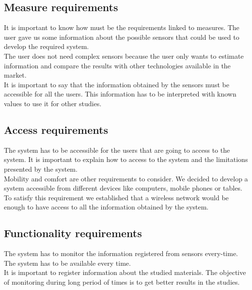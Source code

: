 \subsection{Measure requirements}

It is important to know how must be the requirements linked to measures. The user gave us some information about the possible sensors that could be used to develop the required system.\\

The user does not need complex sensors because the user only wants to estimate information and compare the results with other technologies available in the market.\\

It is important to say that the information obtained by the sensors must be accessible for all the users. This information has to be interpreted with known values to use it for other studies.

\subsection{Access requirements}

The system has to be accessible for the users that are going to access to the system. It is important to explain how to access to the system and the limitations presented by the system.\\

Mobility and comfort are other requirements to consider. We decided to develop a system accessible from different devices like computers, mobile phones or tables.\\

To satisfy this requirement we established that a wireless network would be enough to have access to all the information obtained by the system.

\subsection{Functionality requirements}

The system has to monitor the information registered from sensors every-time. The system has to be available every time.\\

It is important to register information about the studied materials. The objective of monitoring during long period of times is to get better results in the studies.\\

